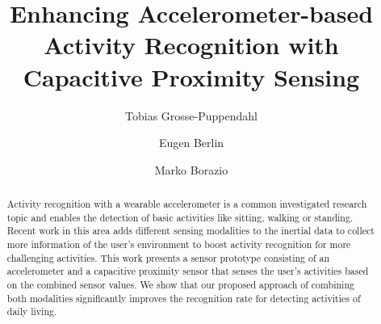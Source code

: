 \documentclass[runningheads,a4paper]{llncs}
\begin{document}
\mainmatter  %

\title{Enhancing Accelerometer-based Activity Recognition with Capacitive Proximity Sensing}


\author{Tobias Grosse-Puppendahl \and Eugen Berlin \and Marko Borazio }





\maketitle
\begin{abstract}
Activity recognition with a wearable accelerometer is a common investigated research topic and enables the detection of basic activities like sitting, walking or standing. Recent work in this area adds different sensing modalities to the inertial data to collect more information of the user's environment to boost activity recognition for more challenging activities. This work presents a sensor prototype consisting of an accelerometer and a capacitive proximity sensor that senses the user's activities based on the combined sensor values. We show that our proposed approach of combining both modalities significantly improves the recognition rate for detecting activities of daily living.
\end{abstract}
\end{document}
